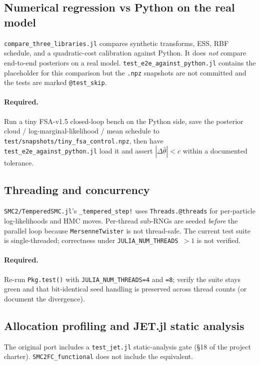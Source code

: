 \documentclass[11pt,a4paper]{article}
\begin{document}
\subsection{Numerical regression vs Python on the real model}
\texttt{compare\_three\_libraries.jl} compares synthetic transforms,
ESS, RBF schedule, and a quadratic-cost calibration against Python. It
does \emph{not} compare end-to-end posteriors on a real model.
\texttt{test\_e2e\_against\_python.jl} contains the placeholder for this
comparison but the \texttt{.npz} snapshots are not committed and the
tests are marked \texttt{@test\_skip}.

\paragraph{Required.} Run a tiny FSA-v1.5 closed-loop bench on the
Python side, save the posterior cloud / log-marginal-likelihood / mean
schedule to \texttt{test/snapshots/tiny\_fsa\_control.npz}, then have
\texttt{test\_e2e\_against\_python.jl} load it and assert
$|\Delta\hat{\theta}| < c$ within a documented tolerance.

\subsection{Threading and concurrency}
\texttt{SMC2/TemperedSMC.jl}'s \texttt{\_tempered\_step!} uses
\texttt{Threads.@threads} for per-particle log-likelihoods and HMC moves.
Per-thread sub-RNGs are seeded \emph{before} the parallel loop because
\texttt{MersenneTwister} is not thread-safe. The current test suite is
single-threaded; correctness under
\texttt{JULIA\_NUM\_THREADS}~$>1$ is not verified.

\paragraph{Required.} Re-run \texttt{Pkg.test()} with
\texttt{JULIA\_NUM\_THREADS=4} and \texttt{=8}; verify the suite stays
green and that bit-identical seed handling is preserved across thread
counts (or document the divergence).

\subsection{Allocation profiling and JET.jl static analysis}
The original port includes a \texttt{test\_jet.jl} static-analysis gate
(\S 18 of the project charter). \texttt{SMC2FC\_functional} does not
include the equivalent.
\end{document}
